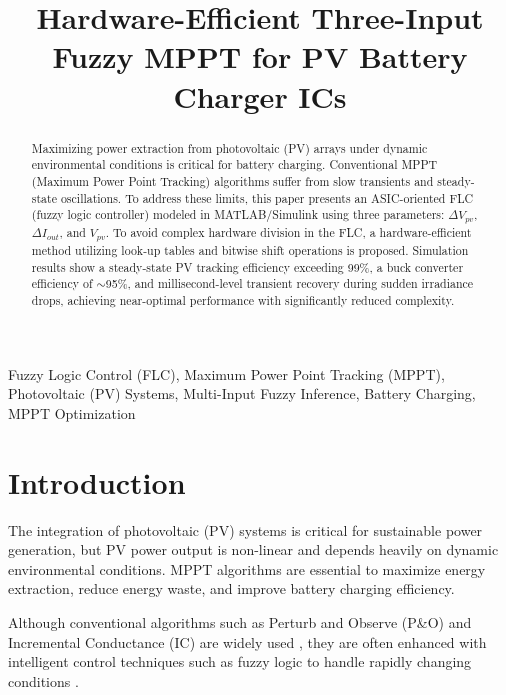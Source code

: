 \documentclass[conference]{IEEEtran}
\begin{document}
\title{Hardware-Efficient Three-Input Fuzzy MPPT for PV Battery Charger ICs}

\author{
}
\maketitle

\begin{abstract} Maximizing power extraction from photovoltaic (PV)
    arrays under dynamic environmental conditions is critical
    for battery charging. Conventional MPPT (Maximum Power Point
    Tracking) algorithms suffer
    from slow transients and steady-state oscillations.
    To address these limits, this paper presents an
    ASIC-oriented FLC (fuzzy logic controller) modeled in
    MATLAB/Simulink using three parameters:
    $\Delta V_{pv}$, $\Delta I_{out}$, and $V_{pv}$.
    To avoid complex hardware division in the FLC,
    a hardware-efficient method utilizing look-up
    tables and bitwise shift operations is proposed.
    Simulation results show a 
    steady-state PV tracking efficiency exceeding
    99\%, a buck converter efficiency of $\sim$95\%,
    and millisecond-level transient recovery during
    sudden irradiance drops, achieving near-optimal performance
    with significantly reduced complexity.
\end{abstract}

\begin{IEEEkeywords}
Fuzzy Logic Control (FLC), Maximum Power Point Tracking (MPPT),
Photovoltaic (PV) Systems, Multi-Input Fuzzy Inference,
Battery Charging, MPPT Optimization
\end{IEEEkeywords}

\section{Introduction}
\label{sec:intro}
The integration of photovoltaic (PV) systems
is critical for sustainable power generation,
but PV power output is non-linear and depends
heavily on dynamic environmental conditions.
MPPT algorithms are
essential to maximize energy extraction,
reduce energy waste, and improve battery charging
efficiency.

Although conventional algorithms such as Perturb
and Observe (P\&O) and Incremental Conductance (IC) are
widely used \cite{po_ic}, they are often enhanced with 
intelligent control techniques such as fuzzy logic
to handle rapidly changing conditions \cite{fuzzy_review}. 
\end{document}
